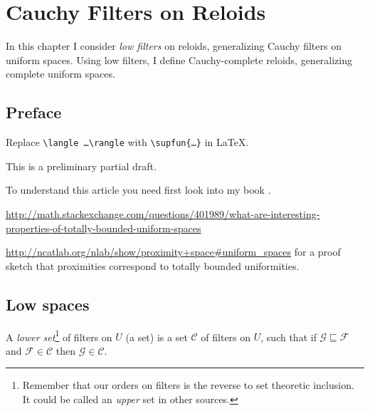 \chapter{Cauchy Filters on Reloids}

In this chapter I consider \emph{low filters} on reloids, generalizing
Cauchy filters on uniform spaces. Using low filters, I define Cauchy-complete
reloids, generalizing complete uniform spaces.

\section{Preface}

Replace {\tt \textbackslash langle \dots \textbackslash rangle} with {\tt \textbackslash supfun\{\dots\}} in \LaTeX{}.

This is a preliminary partial draft.

To understand this article you need first look into my book \cite{volume-1}.

\url{http://math.stackexchange.com/questions/401989/what-are-interesting-properties-of-totally-bounded-uniform-spaces}

\url{http://ncatlab.org/nlab/show/proximity+space\#uniform\_spaces} for a proof
sketch that proximities correspond to totally bounded uniformities.

\section{Low spaces}


\begin{defn}
A \emph{lower set}\footnote{Remember that our orders on filters is the
reverse to set theoretic inclusion. It could be called an \emph{upper} set
in other sources.} of filters on $U$ (a set) is a set $\mathscr{C}$
of filters on $U$, such that if $\mathcal{G} \sqsubseteq
\mathcal{F}$ and $\mathcal{F} \in \mathscr{C}$ then $\mathcal{G} \in
\mathscr{C}$.
\end{defn}

